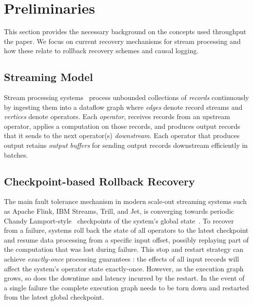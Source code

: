 \documentclass[sigconf]{acmart}
\begin{document}
\section{Preliminaries}
\label{sec:background}

This section provides the necessary background on the concepts used throughput the paper. We focus on current recovery mechanisms for stream processing and how these relate to rollback recovery schemes and causal logging.


\subsection{Streaming Model}
Stream processing systems~\cite{akidau2013millwheel, CarboneKE15, SilvaZD16, NoghabiPP17} process unbounded collections of \textit{records} continuously by ingesting them into a dataflow graph where \textit{edges} denote record streams and \textit{vertices} denote operators.
Each \textit{operator}, receives records from an upstream operator, applies a computation on those records, and produces  output records that it sends to the next operator(s) \textit{downstream}. Each operator that produces output retains \textit{output buffers} for sending output records downstream efficiently in batches.


\subsection{Checkpoint-based Rollback Recovery}

The main fault tolerance mechanism in modern scale-out streaming systems such as Apache Flink, IBM Streams, Trill, and Jet, is converging towards periodic Chandy Lamport-style~\cite{chandy1985distributed} checkpoints of the system's global state~\cite{CarboneKE15, CarboneEF17, ChandramouliGB15, SilvaZD16}.
To recover from a failure, systems roll back the state of all operators to the latest checkpoint and resume data processing from a specific input offset, possibly replaying part of the computation that was lost during failure.
This stop and restart strategy can achieve \textit{exactly-once} processing guarantees \cite{CarboneEF17}: the effects of all input records will affect the system's operator state exactly-once. However, as the execution graph grows, so does the downtime and latency incurred by the restart. In the event of a single failure the complete execution graph needs to be torn down and restarted from the latest global checkpoint. 
\end{document}
